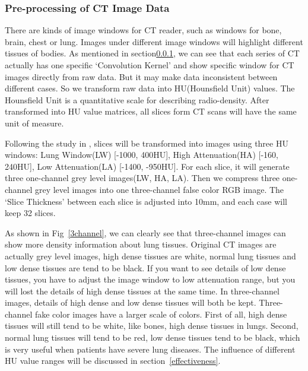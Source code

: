 \documentclass[journal]{IEEEtran}
\begin{document}
\subsubsection{Pre-processing of CT Image Data}
\label{ctimagedata}
There are kinds of image windows for CT reader, such as windows for bone, brain, chest or lung. Images under different image windows will highlight different tissues of bodies.
As mentioned in section\ref{ctimagedata}, we can see that each series of CT actually has one specific `Convolution Kernel' and show specific window for CT images directly from raw data. But it may make data inconsistent between different cases. So we transform raw data into HU(Hounsfield Unit) values. The Hounsfield Unit is a quantitative scale for describing radio-density. After transformed into HU value matrices, all slices form CT scans will have the same unit of measure.

Following the study in \cite{Shin2017Three} \cite{gao2018holistic}, slices will be transformed into images using three HU windows: Lung Window(LW) [-1000, 400HU], High Attenuation(HA) [-160, 240HU], Low Attenuation(LA) [-1400, -950HU]. 
For each slice, it will generate three one-channel grey level images(LW, HA, LA). Then we compress three one-channel grey level images into one three-channel false color RGB image. The `Slice Thickness' between each slice is adjusted into 10mm, and each case will keep 32 slices.

As shown in Fig~\ref{3channel}, we can clearly see that three-channel images can show more density information about lung tissues. Original CT images are actually grey level images, high dense tissues are white, normal lung tissues and low dense tissues are tend to be black. If you want to see details of low dense tissues, you have to adjust the image window to low attenuation range, but you will lost the details of high dense tissues at the same time.
In three-channel images, details of high dense and low dense tissues will both be kept. Three-channel fake color images have a larger scale of colors. First of all, high dense tissues will still tend to be white, like bones, high dense tissues in lungs. Second, normal lung tissues will tend to be red, low dense tissues tend to be black, which is very useful when patients have severe lung diseases.
The influence of different HU value ranges will be discussed in section~\ref{effectiveness}.
\end{document}
